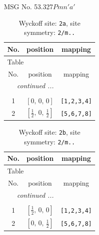 \documentclass[fleqn,8pt]{jsarticle}
\begin{document}
\setcounter{MaxMatrixCols}{32}

\renewcommand{\tablename}{Table~}
\renewcommand{\figurename}{Figure~}
\begin{center}
\LARGE
MSG No. 53.327\quad$Pmn'a'$
\end{center}
\renewcommand{\arraystretch}{1.2}
\begin{longtable}{ccc}
\caption{Wyckoff site: {\tt 2a}, site symmetry: {\tt 2/m..}}
 \\
 \hline \hline
No. & position & mapping \\ \hline \endfirsthead

\multicolumn{2}{l}{\tablename\ \thetable{}} \\
 \hline \hline
No. & position & mapping \\ \hline \endhead

 \hline \hline
\multicolumn{2}{r}{\footnotesize\it continued ...} \\ \endfoot

 \hline \hline
\multicolumn{2}{r}{} \\ \endlastfoot

1 & $\left[ 0,\, 0,\, 0 \right]$ & {\tt [1,2,3,4]} \\ \hline
2 & $\left[ \frac{1}{2},\, 0,\, \frac{1}{2} \right]$ & {\tt [5,6,7,8]} \\
\end{longtable}
\renewcommand{\arraystretch}{1.2}
\begin{longtable}{ccc}
\caption{Wyckoff site: {\tt 2b}, site symmetry: {\tt 2/m..}}
 \\
 \hline \hline
No. & position & mapping \\ \hline \endfirsthead

\multicolumn{2}{l}{\tablename\ \thetable{}} \\
 \hline \hline
No. & position & mapping \\ \hline \endhead

 \hline \hline
\multicolumn{2}{r}{\footnotesize\it continued ...} \\ \endfoot

 \hline \hline
\multicolumn{2}{r}{} \\ \endlastfoot

1 & $\left[ \frac{1}{2},\, 0,\, 0 \right]$ & {\tt [1,2,3,4]} \\ \hline
2 & $\left[ 0,\, 0,\, \frac{1}{2} \right]$ & {\tt [5,6,7,8]} \\
\end{longtable}
\renewcommand{\arraystretch}{1.2}
\end{document}

